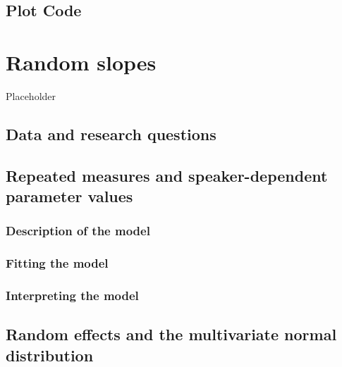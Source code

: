 \documentclass[
]{book}
\begin{document}
\hypertarget{plot-code-4}{%
\section{Plot Code}\label{plot-code-4}}

\hypertarget{random-slopes}{%
\chapter{Random slopes}\label{random-slopes}}

Placeholder

\hypertarget{data-and-research-questions-5}{%
\section{Data and research questions}\label{data-and-research-questions-5}}

\hypertarget{repeated-measures-and-speaker-dependent-parameter-values}{%
\section{Repeated measures and speaker-dependent parameter values}\label{repeated-measures-and-speaker-dependent-parameter-values}}

\hypertarget{description-of-the-model-7}{%
\subsection{Description of the model}\label{description-of-the-model-7}}

\hypertarget{fitting-the-model-6}{%
\subsection{Fitting the model}\label{fitting-the-model-6}}

\hypertarget{interpreting-the-model-4}{%
\subsection{Interpreting the model}\label{interpreting-the-model-4}}

\hypertarget{random-effects-and-the-multivariate-normal-distribution}{%
\section{Random effects and the multivariate normal distribution}\label{random-effects-and-the-multivariate-normal-distribution}}
\end{document}
